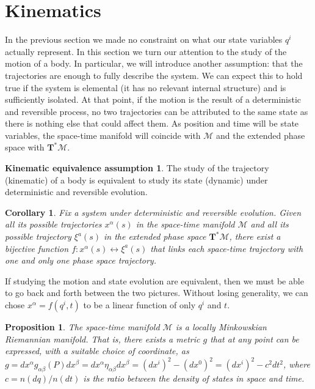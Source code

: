 \documentclass[aps,pra,10pt,twocolumn,floatfix,nofootinbib]{revtex4-1}
\newtheorem{cor}[thm]{Corollary}
\newtheorem{prop}[thm]{Proposition}
\theoremstyle{definition}
\newtheorem*{assump3}{Kinematic equivalence assumption}
\begin{document}
\section{Kinematics}
In the previous section we made no constraint on what our state variables $q^i$ actually represent. In this section we turn our attention to the study of the motion of a body. In particular, we will introduce another assumption: that the trajectories are enough to fully describe the system. We can expect this to hold true if the system is elemental (it has no relevant internal structure) and is sufficiently isolated. At that point, if the motion is the result of a deterministic and reversible process, no two trajectories can be attributed to the same state as there is nothing else that could affect them. As position and time will be state variables, the space-time manifold will coincide with $\mathcal{M}$ and the extended phase space with $\mathbf{T}^*\mathcal{M}$.

\begin{assump3}\label{kinematicAssumption}
The study of the trajectory (kinematic) of a body is equivalent to study its state (dynamic) under deterministic and reversible evolution.
\end{assump3}

\begin{cor}\label{singleTrajectory}
Fix a system under deterministic and reversible evolution. Given all its possible trajectories $x^\alpha(s)$ in the space-time manifold $\mathcal{M}$ and all its possible trajectory $\xi^a(s)$ in the extended phase space $\mathbf{T}^*\mathcal{M}$, there exist a bijective function $f: x^\alpha(s) \leftrightarrow \xi^a(s)$ that links each space-time trajectory with one and only one phase space trajectory.
\end{cor}

If studying the motion and state evolution are equivalent, then we must be able to go back and forth between the two pictures. Without losing generality, we can chose $x^\alpha=f(q^i,t)$ to be a linear function of only $q^i$ and $t$.

\begin{prop}\label{locallyMinkowski}
The space-time manifold $\mathcal{M}$ is a locally Minkowskian Riemannian manifold. That is, there exists a metric $g$ that at any point can be expressed, with a suitable choice of coordinate, as $g=dx^\alpha g_{\alpha \beta}(P) dx^\beta=dx^\alpha\eta_{\alpha \beta}dx^\beta=(dx^i)^2 - (dx^0)^2=(dx^i)^2 - c^2dt^2$, where $c=n(dq)/n(dt)$ is the ratio between the density of states in space and time.
\end{prop}
\end{document}
